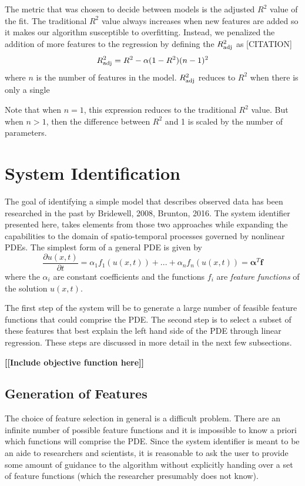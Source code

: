 \documentclass{article}
\newcommand{\todo}[1]{\textbf{[[#1]]}}
\begin{document}
The metric that was chosen to decide between models is the adjusted $R^2$ value of the fit. The traditional $R^2$ value always increases when new features are added so it makes our algorithm susceptible to overfitting. Instead, we penalized the addition of more features to the regression by defining the $R_{\rm adj}^2$ as [CITATION]
\[ R_{\rm adj}^2 = R^2 - \alpha (1-  R^2)(n-1)^2\]
where $n$ is the number of features in the model. $R_{\rm adj}^2$ reduces to $R^2$ when there is only a single

Note that when $n=1$, this expression reduces to the traditional $R^2$ value. But when $n>1$, then the difference between $R^2$ and 1 is scaled by the number of parameters.


\section{System Identification}
\label{systemidentification}

The goal of identifying a simple model that describes observed data has been researched in the past by Bridewell, 2008, Brunton, 2016. The system identifier presented here, takes elements from those two approaches while expanding the capabilities to the domain of spatio-temporal processes governed by nonlinear PDEs. The simplest form of a general PDE is given by
\[ \frac{\partial u(x,t)}{\partial t} = \alpha_1 f_1(u(x,t)) + ... + \alpha_n f_n(u(x,t)) = \bm{\alpha}^T \bm{f} \]
where the $\alpha_i$ are constant coefficients and the functions $f_i$ are \textit{feature functions} of the solution $u(x,t)$.

The first step of the system will be to generate a large number of feasible feature functions that could comprise the PDE. The second step is to select a subset of these features that best explain the left hand side of the PDE through linear regression. These steps are discussed in more detail in the next few subsections.

\todo{Include objective function here}

\subsection{Generation of Features}
The choice of feature selection in general is a difficult problem. There are an infinite number of possible feature functions and it is impossible to know a priori which functions will comprise the PDE. Since the system identifier is meant to be an aide to researchers and scientists, it is reasonable to ask the user to provide some amount of guidance to the algorithm without explicitly handing over a set of feature functions (which the researcher presumably does not know).
\end{document}
